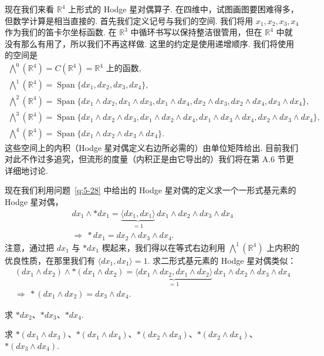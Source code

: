 现在我们来看 $\mathbb{R}^4$ 上形式的 Hodge 星对偶算子. 在四维中，试图画图要困难得多，但数学计算是相当直接的. 首先我们定义记号与我们的空间. 我们将用 $x_1,x_2,x_3,x_4$ 作为我们的笛卡尔坐标函数. 在 $\mathbb{R}^3$ 中循环书写以保持整洁很管用，但在 $\mathbb{R}^4$ 中就没有那么有用了，所以我们不再这样做. 这里的约定是使用递增顺序. 我们将使用的空间是
\begin{align*}
\bigwedge^0(\mathbb{R}^4)=C(\mathbb{R}^4)=\mathbb{R}^4\text{ 上的函数}, \\
\bigwedge^1(\mathbb{R}^4)=\operatorname{Span}\{dx_1,dx_2,dx_3,dx_4\}, \\
\bigwedge^2(\mathbb{R}^4)=\operatorname{Span}\{dx_1\wedge dx_2,dx_1\wedge dx_3,dx_1\wedge dx_4,dx_2\wedge dx_3,dx_2\wedge dx_4,dx_3\wedge dx_4\}, \\
\bigwedge^3(\mathbb{R}^4)=\operatorname{Span}\{dx_1\wedge dx_2\wedge dx_3,dx_1\wedge dx_2\wedge dx_4,dx_1\wedge dx_3\wedge dx_4,dx_2\wedge dx_3\wedge dx_4\}, \\
\bigwedge^4(\mathbb{R}^4)=\operatorname{Span}\{dx_1\wedge dx_2\wedge dx_3\wedge dx_4\}.
\end{align*}
这些空间上的内积（Hodge 星对偶定义右边所必需的）由单位矩阵给出. 目前我们对此不作过多追究，但流形的度量（内积正是由它导出的）我们将在第 A.6 节更详细地讨论.

现在我们利用问题~\ref{q:5-28} 中给出的 Hodge 星对偶的定义求一个一形式基元素的 Hodge 星对偶，
\begin{align*}
dx_1\wedge\ast dx_1=\underbrace{\langle dx_1,dx_1\rangle}_{=1}\,dx_1\wedge dx_2\wedge dx_3\wedge dx_4 \\
\Longrightarrow\ \ast dx_1=dx_2\wedge dx_3\wedge dx_4.
\end{align*}
注意，通过把 $dx_1$ 与 $\ast dx_1$ 楔起来，我们得以在等式右边利用 $\bigwedge^1(\mathbb{R}^4)$ 上内积的优良性质，在那里我们有 $\langle dx_1,dx_1\rangle=1$. 求二形式基元素的 Hodge 星对偶类似：
\begin{align*}
(dx_1\wedge dx_2)\wedge\ast(dx_1\wedge dx_2)=\underbrace{\langle dx_1\wedge dx_2,dx_1\wedge dx_2\rangle}_{=1}\,dx_1\wedge dx_2\wedge dx_3\wedge dx_4 \\
\Longrightarrow\ \ast(dx_1\wedge dx_2)=dx_3\wedge dx_4.
\end{align*}

\begin{question}\label{q:5-29}
求 $\ast dx_2$、$\ast dx_3$、$\ast dx_4$.
\end{question}

\begin{question}\label{q:5-30}
求 $*(dx_1\wedge dx_3)$、$*(dx_1\wedge dx_4)$、$*(dx_2\wedge dx_3)$、$*(dx_2\wedge dx_4)$、$*(dx_3\wedge dx_4)$.
\end{question}

